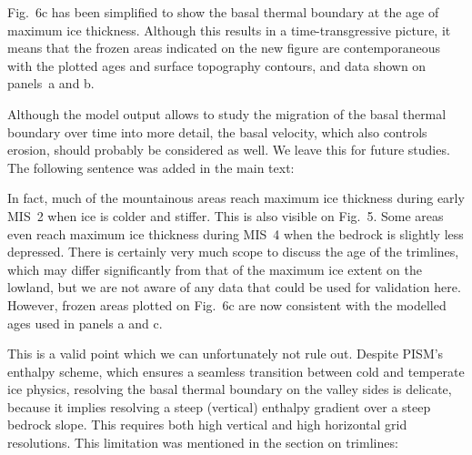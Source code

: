     Fig.~6c has been simplified to show the basal thermal boundary at the age
    of maximum ice thickness. Although this results in a time-transgressive
    picture, it means that the frozen areas indicated on the new figure are
    contemporaneous with the plotted ages and surface topography contours, and
    data shown on panels~a and b.

    Although the model output allows to study the migration of the basal
    thermal boundary over time into more detail, the basal velocity, which also
    controls erosion, should probably be considered as well. We leave this for
    future studies. The following sentence was added in the main text:



    In fact, much of the mountainous areas reach maximum ice thickness during
    early MIS~2 when ice is colder and stiffer. This is also visible on
    Fig.~5. Some areas even reach maximum ice thickness during MIS~4 when the
    bedrock is slightly less depressed. There is certainly very much scope to
    discuss the age of the trimlines, which may differ significantly from that of
    the maximum ice extent on the lowland, but we are not aware of any data
    that could be used for validation here. However, frozen areas plotted on
    Fig.~6c are now consistent with the modelled ages used in panels a and c.


    This is a valid point which we can unfortunately not rule out. Despite
    PISM's enthalpy scheme, which ensures a seamless transition between cold
    and temperate ice physics, resolving the basal thermal boundary on the
    valley sides is delicate, because it implies resolving a steep (vertical)
    enthalpy gradient over a steep bedrock slope. This requires both high
    vertical and high horizontal grid resolutions. This limitation was mentioned
    in the section on trimlines:


